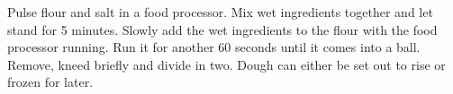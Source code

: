\begin{recipe}

Pulse flour and salt in a food processor. Mix wet ingredients together and
let stand for 5 minutes. Slowly add the wet ingredients to the flour with the
food processor running. Run it for another 60 seconds until it comes into a
ball. Remove, kneed briefly and divide in two. Dough can either be set out
to rise or frozen for later.

\end{recipe}
